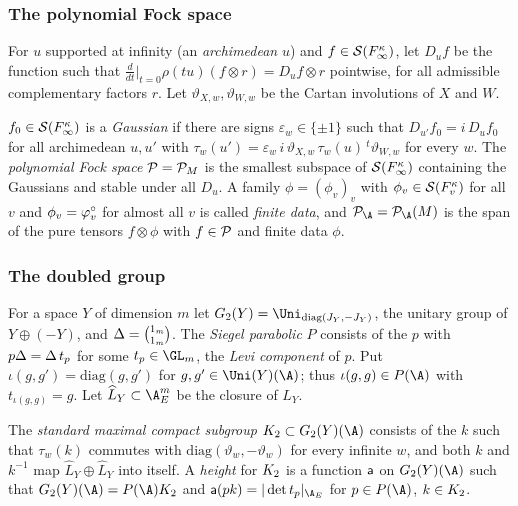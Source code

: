 \subsubsection*{The polynomial Fock space}
For $u$ supported at infinity (an \emph{archimedean} $u$) and $f\in\mathcal{S}(F_\infty^\kappa)$, let $D_uf$ be the
function such that $\frac{d}{dt}\big|_{t=0}\rho(tu)(f\otimes r)=D_uf\otimes r$ pointwise, for all
admissible complementary factors $r$. Let $\vartheta_{X,w},\vartheta_{W,w}$ be the Cartan involutions of $X$ and $W$.

\begin{definition}\label{pf:tlift:pol}
$f_0\in\mathcal{S}(F_\infty^\kappa)$ is a \emph{Gaussian} if there are signs $\varepsilon_w\in\{\pm1\}$ such that
$D_{u'}f_0=i\,D_uf_0$ for all archimedean $u,u'$ with
$\tau_w(u')=\varepsilon_w\,i\,\vartheta_{X,w}\,\tau_w(u)\,{}^t\vartheta_{W,w}$ for every $w$. The \emph{polynomial Fock
space} $\mathcal{P}=\mathcal{P}_M$ is the smallest subspace of $\mathcal{S}(F_\infty^\kappa)$ containing the Gaussians
and stable under all $D_u$. A family $\phi=(\phi_v)_v$ with $\phi_v\in\mathcal{S}(F_v^\kappa)$ for all $v$ and
$\phi_v=\varphi^{\circ}_v$ for almost all $v$ is called \emph{finite data}, and $\tliftPD=\tliftPD(M)$ is the span of the
pure tensors $f\otimes\phi$ with $f\in\mathcal{P}$ and finite data $\phi$.
\end{definition}

\subsubsection*{The doubled group}
For a space $Y$ of dimension $m$ let $G_2(Y)=\Uni_{\mathrm{diag}(J_Y,-J_Y)}$, the unitary group of
$Y\oplus(-Y)$, and $\Delta={1_m\choose1_m}$. The \emph{Siegel parabolic} $P$ consists of the $p$ with
$p\Delta=\Delta\,t_p$ for some $t_p\in\GL_m$, the \emph{Levi component} of $p$. Put $\iota(g,g')=\mathrm{diag}(g,g')$
for $g,g'\in\Uni(Y)(\A)$; thus $\iota(g,g)\in P(\A)$ with $t_{\iota(g,g)}=g$. Let $\widehat L_Y\subset\tliftAE^m$ be
the closure of $L_Y$.

\begin{definition}\label{pf:tlift:stab2}
The \emph{standard maximal compact subgroup} $\tliftK\subset G_2(Y)(\A)$ consists of the $k$ such that
$\tau_w(k)$ commutes with $\mathrm{diag}(\vartheta_w,-\vartheta_w)$ for every infinite $w$, and both $k$ and $k^{-1}$
map $\widehat L_Y\oplus\widehat L_Y$ into itself. A \emph{height} for $K_2$ is a function $\mathsf{a}$ on
$G_2(Y)(\A)$ such that $G_2(Y)(\A)=P(\A)\tliftK$ and $\tliftht(pk)=|\det t_p|_{\tliftAE}$ for $p\in P(\A)$,
$k\in K_2$. 
\end{definition}

